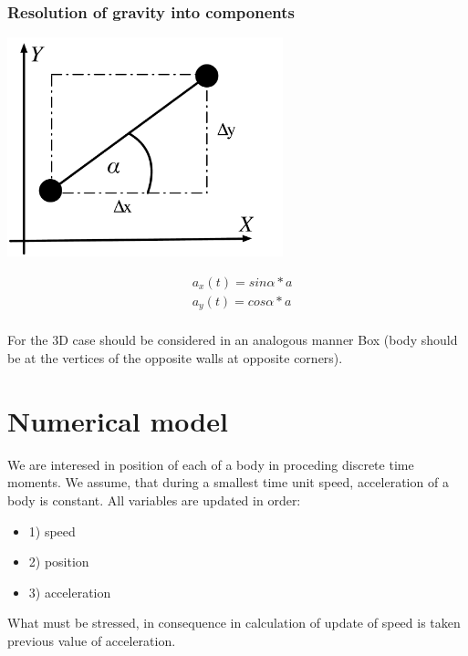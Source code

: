 \documentclass[fleqn]{article}
\begin{document}
\begin{frame}
\frametitle{Resolution of gravity into components}
\begin{center}
\includegraphics[width=8cm]{resolutionofgravity.pdf}
\end{center}
\end{frame}

\begin{align*}
    &a_{x}(t) = sin\alpha * a \\
    &a_{y}(t) = cos\alpha * a \\
\end{align*}

For the 3D case should be considered in an analogous manner Box (body should be at the vertices of the opposite walls at opposite corners).

\section{Numerical model}
We are interesed in position of each of a body in proceding discrete time moments. We assume, that during a smallest time unit speed, acceleration of a body is constant. All variables are updated in order: 
\begin{itemize}
    \item 1) speed
    \item 2) position
    \item 3) acceleration
\end{itemize}

What must be stressed, in consequence in calculation of update of speed is taken previous value of acceleration.
\end{document}
